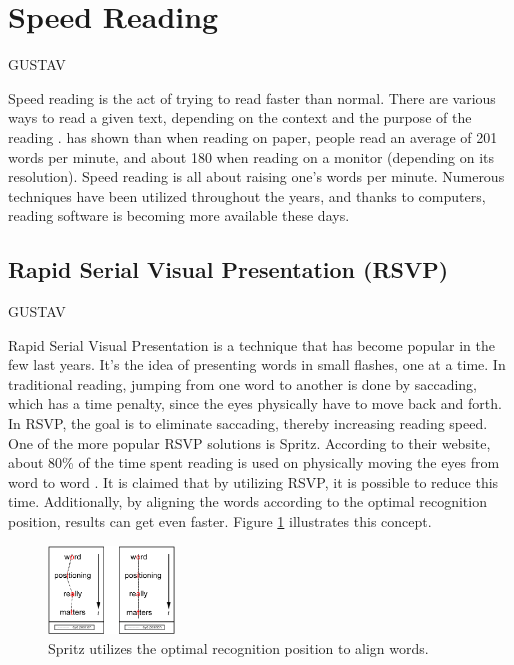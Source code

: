 \section{Speed Reading}
GUSTAV

Speed reading is the act of trying to read faster than normal. There are various ways to read a given text, depending on the context and the purpose of the reading \cite{differentWaysOfReading}.  has shown than when reading on paper, people read an average of 201 words per minute, and about 180 when reading on a monitor (depending on its resolution). Speed reading is all about raising one's words per minute. Numerous techniques have been utilized throughout the years, and  thanks to computers, reading software is becoming more available these days.


\subsection{Rapid Serial Visual Presentation (RSVP)}
GUSTAV

Rapid Serial Visual Presentation is a technique that has become popular in the few last years. It's the idea of presenting words in small flashes, one at a time. In traditional reading, jumping from one word to another is done by saccading, which has a time penalty, since the eyes physically have to move back and forth. In RSVP, the goal is to eliminate saccading, thereby increasing reading speed. One of the more popular RSVP solutions is Spritz. According to their website, about 80\% of the time spent reading is used on physically moving the eyes from word to word \cite{spritz}.	It is claimed that by utilizing RSVP, it is possible to reduce this time. Additionally, by aligning the words according to the optimal recognition position, results can get even faster. Figure \ref{fig:spritz_orp} illustrates this concept.

\begin{figure}[htbp]
\centering
\includegraphics[width=0.3\textwidth]{Pics/opr_spritz}
\caption{Spritz utilizes the optimal recognition position to align words.}
\label{fig:spritz_orp}
\end{figure}

